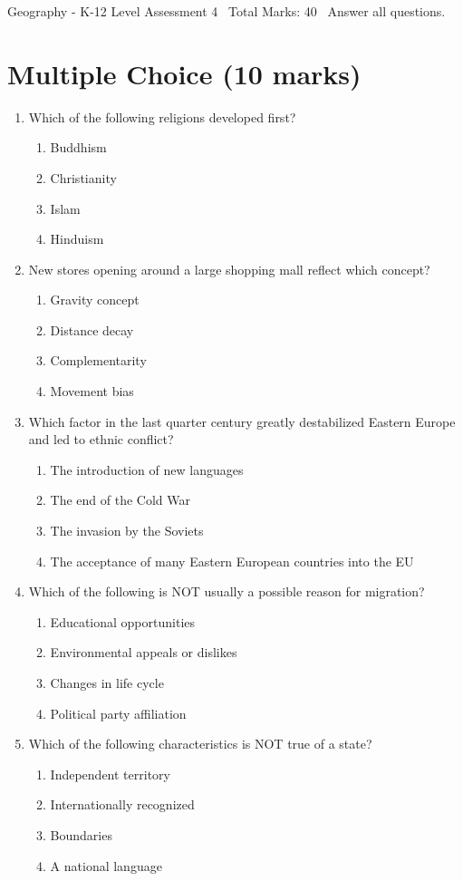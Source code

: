 \documentclass[12pt]{article}
\begin{document}
\begin{center}
Geography - K-12 Level Assessment 4 \
Total Marks: 40 \
Answer all questions.
\end{center}

\section*{Multiple Choice (10 marks)}
\begin{enumerate}[label=\arabic*.]
\item Which of the following religions developed first?
\begin{enumerate}[label=(\alph*)]
    \item Buddhism
    \item Christianity
    \item Islam
    \item Hinduism
\end{enumerate}
\item New stores opening around a large shopping mall reflect which concept?
\begin{enumerate}[label=(\alph*)]
    \item Gravity concept
    \item Distance decay
    \item Complementarity
    \item Movement bias
\end{enumerate}
\item Which factor in the last quarter century greatly destabilized Eastern Europe and led to
ethnic conflict?
\begin{enumerate}[label=(\alph*)]
    \item The introduction of new languages
    \item The end of the Cold War
    \item The invasion by the Soviets
    \item The acceptance of many Eastern European countries into the EU
\end{enumerate}
\item Which of the following is NOT usually a possible reason for migration?
\begin{enumerate}[label=(\alph*)]
    \item Educational opportunities
    \item Environmental appeals or dislikes
    \item Changes in life cycle
    \item Political party affiliation
\end{enumerate}
\item Which of the following characteristics is NOT true of a state?
\begin{enumerate}[label=(\alph*)]
    \item Independent territory
    \item Internationally recognized
    \item Boundaries
    \item A national language
\end{enumerate}
\end{enumerate}
\end{document}
